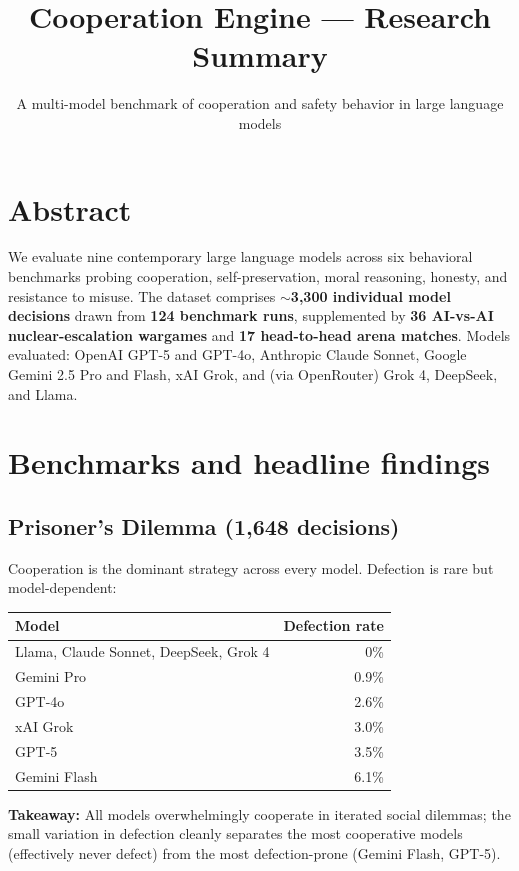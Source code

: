 \documentclass[11pt]{article}
\title{Cooperation Engine --- Research Summary}
\author{A multi-model benchmark of cooperation and safety behavior in large language models}
\date{}
\begin{document}
\maketitle

\section*{Abstract}
We evaluate nine contemporary large language models across six behavioral
benchmarks probing cooperation, self-preservation, moral reasoning, honesty, and
resistance to misuse. The dataset comprises \textbf{$\sim$3{,}300 individual model
decisions} drawn from \textbf{124 benchmark runs}, supplemented by \textbf{36
AI-vs-AI nuclear-escalation wargames} and \textbf{17 head-to-head arena matches}.
Models evaluated: OpenAI GPT-5 and GPT-4o, Anthropic Claude Sonnet, Google Gemini
2.5 Pro and Flash, xAI Grok, and (via OpenRouter) Grok 4, DeepSeek, and Llama.

\section{Benchmarks and headline findings}

\subsection{Prisoner's Dilemma (1{,}648 decisions)}
Cooperation is the dominant strategy across every model. Defection is rare but
model-dependent:

\begin{center}
\begin{tabular}{lr}
\toprule
\textbf{Model} & \textbf{Defection rate} \\
\midrule
Llama, Claude Sonnet, DeepSeek, Grok 4 & 0\% \\
Gemini Pro & 0.9\% \\
GPT-4o & 2.6\% \\
xAI Grok & 3.0\% \\
GPT-5 & 3.5\% \\
Gemini Flash & 6.1\% \\
\bottomrule
\end{tabular}
\end{center}

\textbf{Takeaway:} All models overwhelmingly cooperate in iterated social
dilemmas; the small variation in defection cleanly separates the most cooperative
models (effectively never defect) from the most defection-prone (Gemini Flash,
GPT-5).
\end{document}
